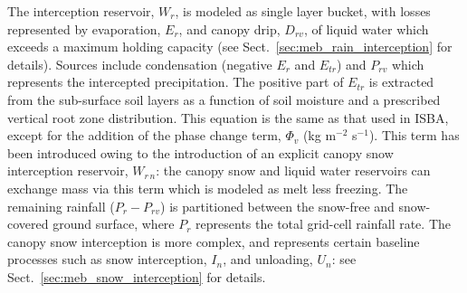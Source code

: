 The interception reservoir, $W_r$, is modeled as single
layer bucket, with losses represented by evaporation, $E_r$, and
canopy drip, $D_{rv}$,  of liquid water which exceeds a maximum holding capacity
(see Sect.~\ref{sec:meb_rain_interception} for details). 
Sources include condensation (negative $E_r$ and $E_{tr}$) and
$P_{rv}$ which represents the intercepted precipitation. 
The positive part of $E_{tr}$ is extracted from the sub-surface soil
layers as a function of soil moisture and 
a prescribed vertical root zone distribution.
%
This equation is the same as that used in ISBA, except for the
addition of the phase change term, $\Phi_{v}$ (kg m$^{-2}$
s$^{-1}$). This term has been introduced owing to the introduction of
an explicit canopy snow interception reservoir, $W_{r\,n}$: the
canopy snow and 
liquid water reservoirs can exchange mass via this term which
is modeled as melt less
freezing. 
%
The remaining
rainfall ($P_r-P_{rv}$) is partitioned between the snow-free and
snow-covered ground surface,
where $P_r$ represents the total grid-cell rainfall rate.
The canopy snow interception is more complex, and represents certain
baseline processes such as snow interception, $I_n$, and unloading,
$U_n$: see Sect.~\ref{sec:meb_snow_interception} for details. 

